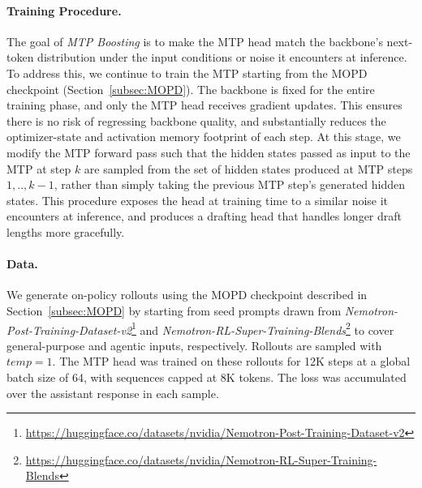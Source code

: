 \paragraph{Training Procedure.}
The goal of \emph{MTP Boosting} is to make the MTP head match the backbone's next-token distribution under the input conditions or noise it encounters at inference. To address this, we continue to train the MTP starting from the MOPD checkpoint (Section~\ref{subsec:MOPD}). The backbone is fixed for the entire training phase, and only the MTP head receives gradient updates. This ensures there is no risk of regressing backbone quality, and substantially reduces the optimizer-state and activation memory footprint of each step. At this stage, we modify the MTP forward pass such that the hidden states passed as input to the MTP at step $k$ are sampled from the set of hidden states produced at MTP steps $1,..,k-1$, rather than simply taking the previous MTP step's generated hidden states. This procedure exposes the head at training time to a similar noise it encounters at inference, and produces a drafting head that handles longer draft lengths more gracefully.

\paragraph{Data.}
We generate on-policy rollouts using the MOPD checkpoint described in Section~\ref{subsec:MOPD} by starting from seed prompts drawn from \textit{Nemotron-Post-Training-Dataset-v2}\footnote{\url{https://huggingface.co/datasets/nvidia/Nemotron-Post-Training-Dataset-v2}} and \textit{Nemotron-RL-Super-Training-Blends}\footnote{\url{https://huggingface.co/datasets/nvidia/Nemotron-RL-Super-Training-Blends} } to cover general-purpose and agentic inputs, respectively. Rollouts are sampled with $temp=1$. The MTP head was trained on these rollouts for 12K steps at a global batch size of 64, with sequences capped at 8K tokens. The loss was accumulated over the assistant response in each sample.

